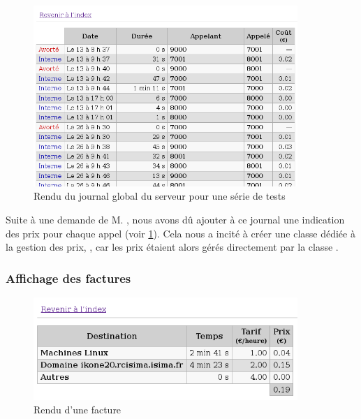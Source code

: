 \begin{figure}
\begin{center}
\includegraphics[width=10cm]{images/journal-global.png}
\end{center}
\label{imgjournal}
\caption{Rendu du journal global du serveur pour une série de tests}
\end{figure}

Suite à une demande de M. , nous avons dû ajouter à ce journal une indication des prix pour chaque appel (voir \cref{imgjournal}). Cela nous a incité à créer une classe dédiée à la gestion des prix, , car les prix étaient alors gérés directement par la classe .

\subsubsection{Affichage des factures}

\begin{figure}
\begin{center}
\includegraphics[width=10cm]{images/facture.png}
\end{center}
\label{imgfacture}
\caption{Rendu d’une facture}
\end{figure}

